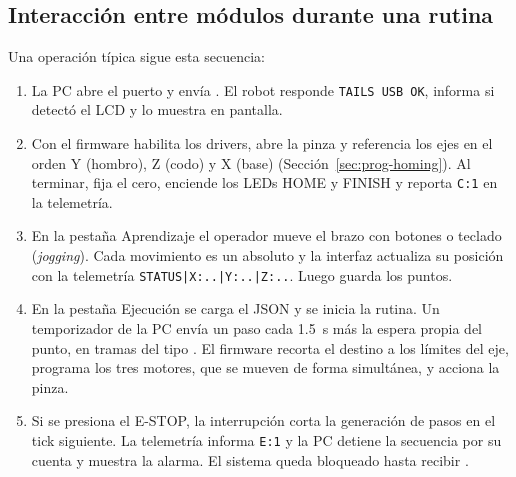 \subsection{Interacción entre módulos durante una rutina}
Una operación típica sigue esta secuencia:
\begin{enumerate}
  \item La PC abre el puerto y envía . El robot responde \texttt{TAILS USB OK},
        informa si detectó el LCD y lo muestra en pantalla.
  \item Con  el firmware habilita los drivers, abre la pinza y referencia los ejes en
        el orden Y (hombro), Z (codo) y X (base) (Sección~\ref{sec:prog-homing}). Al terminar,
        fija el cero, enciende los LEDs HOME y FINISH y reporta \texttt{C:1} en la telemetría.
  \item En la pestaña Aprendizaje el operador mueve el brazo con botones o teclado
        (\emph{jogging}). Cada movimiento es un \cmd{:\#} absoluto y la interfaz actualiza su
        posición con la telemetría \texttt{STATUS|X:..|Y:..|Z:..}. Luego guarda los puntos.
  \item En la pestaña Ejecución se carga el JSON y se inicia la rutina. Un temporizador de la
        PC envía un paso cada \SI{1,5}{\second} más la espera propia del punto, en tramas del
        tipo . El firmware recorta el destino a los límites del eje,
        programa los tres motores, que se mueven de forma simultánea, y acciona la pinza.
  \item Si se presiona el E-STOP, la interrupción corta la generación de pasos en el tick
        siguiente. La telemetría informa \texttt{E:1} y la PC detiene la secuencia por su cuenta
        y muestra la alarma. El sistema queda bloqueado hasta recibir .
\end{enumerate}

